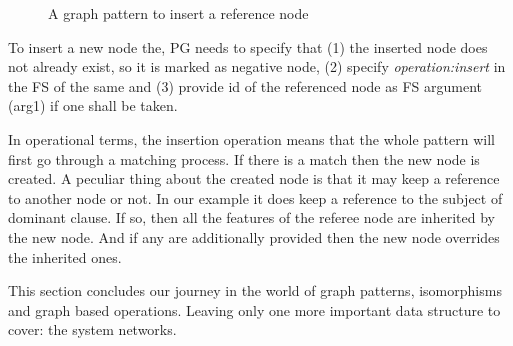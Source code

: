 \begin{figure}[H]
\centering
{}
\caption{A graph pattern to insert a reference node}
\label{fig:gp5}
\end{figure}


To insert a new node the, PG needs to specify that (1) the inserted node does not already exist, so it is marked as negative node, (2) specify \textit{operation:insert} in the FS of the same and (3) provide id of the referenced node as FS argument (arg1) if one shall be taken.

In operational terms, the insertion operation means that the whole pattern will first go through a matching process. If there is a match then the new node is created. A peculiar thing about the created node is that it may keep a reference to another node or not. In our example it does keep a reference to the subject of dominant clause. If so, then all the features of the referee node are inherited by the new node. And if any are additionally provided then the new node overrides the inherited ones.

This section concludes our journey in the world of graph patterns, isomorphisms and graph based operations. Leaving only one more important data structure to cover: the system networks. 

